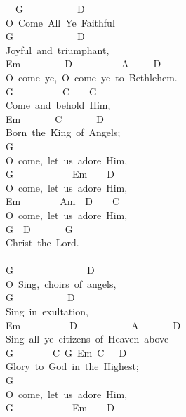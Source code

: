 \documentclass[]{book}
\begin{document}
~~G~~~~~~~~~~~D\\
O~Come~All~Ye~Faithful\\
G~~~~~~~~~~~~~D\\
Joyful~and~triumphant,\\
\hspace*{0.333em}\hspace*{0.333em}Em~~~~~~~~~D~~~~~~~~~~A~~~~~D\\
O~come~ye,~O~come~ye~to~Bethlehem.\\
G~~~~~~~~~~C~~~~G\\
Come~and~behold~Him,\\
Em~~~~~~~C~~~~~~~D\\
Born~the~King~of~Angels;\\
\hspace*{0.333em}\hspace*{0.333em}G\\
O~come,~let~us~adore~Him,\\
\hspace*{0.333em}\hspace*{0.333em}G~~~~~~~~~~~~Em~~~~D\\
O~come,~let~us~adore~Him,\\
\hspace*{0.333em}\hspace*{0.333em}Em~~~~~~~~Am~~D~~~~C\\
O~come,~let~us~adore~Him,\\
G~~D~~~~~~~G\\
Christ~the~Lord.\\
~\\
\hspace*{0.333em}\hspace*{0.333em}G~~~~~~~~~~~~~~~D\\
O~Sing,~choirs~of~angels,\\
G~~~~~~~~~~~D\\
Sing~in~exultation,\\
Em~~~~~~~~~~D~~~~~~~~~~~A~~~~~~~D\\
Sing~all~ye~citizens~of~Heaven~above\\
G~~~~~~~~C~G~Em~C~~~D\\
Glory~to~God~in~the~Highest;\\
\hspace*{0.333em}\hspace*{0.333em}G\\
O~come,~let~us~adore~Him,\\
\hspace*{0.333em}\hspace*{0.333em}G~~~~~~~~~~~~Em~~~~D\\
\end{document}
